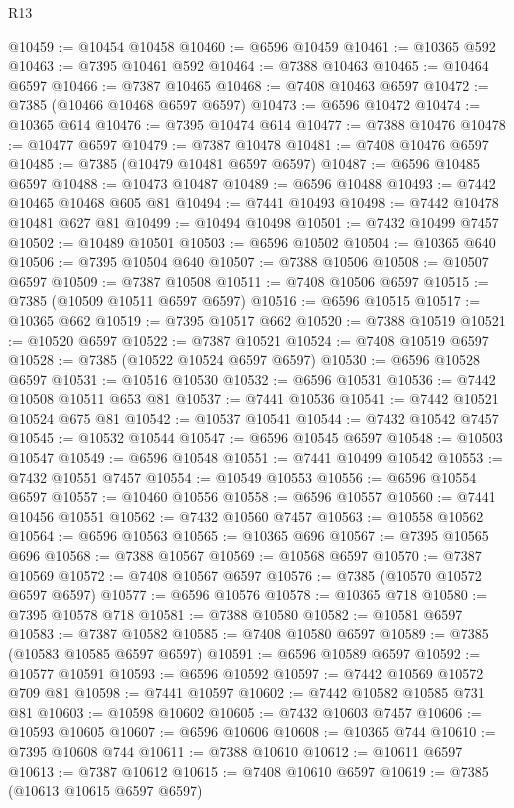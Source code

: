 \begin{lexlean}{R13}
\begin{coremodule}
@10459 := @10454 @10458
@10460 := @6596 @10459
@10461 := @10365 @592
@10463 := @7395 @10461 @592
@10464 := @7388 @10463
@10465 := @10464 @6597
@10466 := @7387 @10465
@10468 := @7408 @10463 @6597
@10472 := @7385 (@10466 @10468 @6597 @6597)
@10473 := @6596 @10472
@10474 := @10365 @614
@10476 := @7395 @10474 @614
@10477 := @7388 @10476
@10478 := @10477 @6597
@10479 := @7387 @10478
@10481 := @7408 @10476 @6597
@10485 := @7385 (@10479 @10481 @6597 @6597)
@10487 := @6596 @10485 @6597
@10488 := @10473 @10487
@10489 := @6596 @10488
@10493 := @7442 @10465 @10468 @605 @81
@10494 := @7441 @10493
@10498 := @7442 @10478 @10481 @627 @81
@10499 := @10494 @10498
@10501 := @7432 @10499 @7457
@10502 := @10489 @10501
@10503 := @6596 @10502
@10504 := @10365 @640
@10506 := @7395 @10504 @640
@10507 := @7388 @10506
@10508 := @10507 @6597
@10509 := @7387 @10508
@10511 := @7408 @10506 @6597
@10515 := @7385 (@10509 @10511 @6597 @6597)
@10516 := @6596 @10515
@10517 := @10365 @662
@10519 := @7395 @10517 @662
@10520 := @7388 @10519
@10521 := @10520 @6597
@10522 := @7387 @10521
@10524 := @7408 @10519 @6597
@10528 := @7385 (@10522 @10524 @6597 @6597)
@10530 := @6596 @10528 @6597
@10531 := @10516 @10530
@10532 := @6596 @10531
@10536 := @7442 @10508 @10511 @653 @81
@10537 := @7441 @10536
@10541 := @7442 @10521 @10524 @675 @81
@10542 := @10537 @10541
@10544 := @7432 @10542 @7457
@10545 := @10532 @10544
@10547 := @6596 @10545 @6597
@10548 := @10503 @10547
@10549 := @6596 @10548
@10551 := @7441 @10499 @10542
@10553 := @7432 @10551 @7457
@10554 := @10549 @10553
@10556 := @6596 @10554 @6597
@10557 := @10460 @10556
@10558 := @6596 @10557
@10560 := @7441 @10456 @10551
@10562 := @7432 @10560 @7457
@10563 := @10558 @10562
@10564 := @6596 @10563
@10565 := @10365 @696
@10567 := @7395 @10565 @696
@10568 := @7388 @10567
@10569 := @10568 @6597
@10570 := @7387 @10569
@10572 := @7408 @10567 @6597
@10576 := @7385 (@10570 @10572 @6597 @6597)
@10577 := @6596 @10576
@10578 := @10365 @718
@10580 := @7395 @10578 @718
@10581 := @7388 @10580
@10582 := @10581 @6597
@10583 := @7387 @10582
@10585 := @7408 @10580 @6597
@10589 := @7385 (@10583 @10585 @6597 @6597)
@10591 := @6596 @10589 @6597
@10592 := @10577 @10591
@10593 := @6596 @10592
@10597 := @7442 @10569 @10572 @709 @81
@10598 := @7441 @10597
@10602 := @7442 @10582 @10585 @731 @81
@10603 := @10598 @10602
@10605 := @7432 @10603 @7457
@10606 := @10593 @10605
@10607 := @6596 @10606
@10608 := @10365 @744
@10610 := @7395 @10608 @744
@10611 := @7388 @10610
@10612 := @10611 @6597
@10613 := @7387 @10612
@10615 := @7408 @10610 @6597
@10619 := @7385 (@10613 @10615 @6597 @6597)

\end{coremodule}
\end{lexlean}

